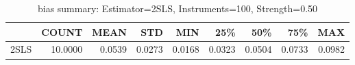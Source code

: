 \begin{table}[ht]
\centering
\caption{bias summary: Estimator=2SLS, Instruments=100, Strength=0.50}
\begin{tabular}{lrrrrrrrr}
\toprule
 & COUNT & MEAN & STD & MIN & 25\% & 50\% & 75\% & MAX \\
\midrule
2SLS & 10.0000 & 0.0539 & 0.0273 & 0.0168 & 0.0323 & 0.0504 & 0.0733 & 0.0982 \\
\bottomrule
\end{tabular}
\end{table}
